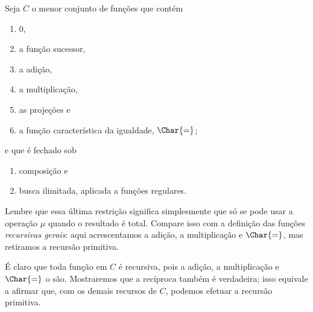 \documentclass[../../../include/open-logic-section]{subfiles}
\begin{document}

Seja $C$ o menor conjunto de funções que contém
\begin{enumerate}
\item $0$,
\item a função sucessor,
\item a adição,
\item a multiplicação,
\item as projeções e
\item a função característica da igualdade, $\Char{=}$;
\end{enumerate}
e que é fechado sob
\begin{enumerate}
\item composição e
\item busca ilimitada, aplicada a funções
regulares.
\end{enumerate}
Lembre que essa última restrição significa simplesmente que só se pode
usar a operação $\mu$ quando o resultado é total. Compare isso com a
definição das funções \emph{recursivas gerais}: aqui acrescentamos a
adição, a multiplicação e $\Char{=}$, mas retiramos a recursão
primitiva.

É claro que toda função em $C$ é recursiva, pois a adição, a
multiplicação e $\Char{=}$ o são. Mostraremos que a recíproca também é
verdadeira; isso equivale a afirmar que, com os demais recursos de $C$,
podemos efetuar a recursão primitiva.
\end{document}
